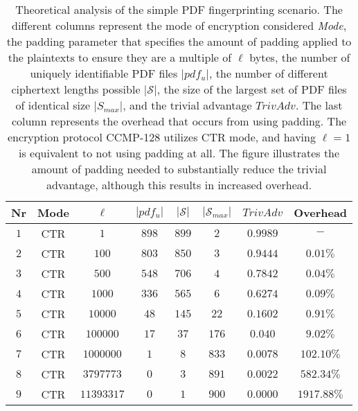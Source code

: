 \begin{table}
	\caption{Theoretical analysis of the simple PDF fingerprinting scenario. The different columns represent the mode of encryption considered \textit{Mode}, the padding parameter that specifies the amount of padding applied to the plaintexts to ensure they are a multiple of $\ell$ bytes, the number of uniquely identifiable PDF files \textit{$|pdf_{u}|$}, the number of different ciphertext lengths possible \textit{$|\mathcal{S}|$}, the size of the largest set of PDF files of identical size \textit{$|S_{max}|$}, and the trivial advantage \textit{$TrivAdv$}. The last column represents the overhead that occurs from using padding. The encryption protocol CCMP-128 utilizes CTR mode, and having $\ell = 1$ is equivalent to not using padding at all. The figure illustrates the amount of padding needed to substantially reduce the trivial advantage, although this results in increased overhead.}
    \centering
    \begin{tabular}{|c| c c c c c |c|c|}
    		\hline
        Nr & Mode & $\ell$ & $|pdf_{u}|$ & $|\mathcal{S}|$ & $|\mathcal{S}_{max}|$ & $TrivAdv$ & Overhead\\
        \hline
        \hline
        $1$ & CTR & $1$ & $898$ & $899$ & $2$ & $0.9989$ & $-$ \\
        \hline
        $2$ & CTR & $100$ & $803$ & $850$ & $3$ & $0.9444$ & $0.01\%$ \\
        \hline
        $3$ & CTR & $500$ & $548$ & $706$ & $4$ & $0.7842$ & $0.04\%$\\
        \hline
        $4$ & CTR & $1000$ & $336$ & $565$ & $6$ & $0.6274$ & $0.09\%$\\
        \hline
        $5$ & CTR & $10 000$ & $48$ & $145$ & $22$ & $0.1602$ & $0.91\%$\\
        \hline
        $6$ & CTR & $100 000$ & $17$ & $37$ & $176$ & $0.040$ & $9.02\%$\\
        \hline
        $7$ & CTR & $1 000 000$ & $1$ & $8$ & $833$ & $0.0078$ & $102.10\%$\\
        \hline
        $8$ & CTR & $3 797 773$ & $0$ & $3$ & $891$ & $0.0022$ & $582.34\%$\\
        \hline
        $9$ & CTR & $11 393 317$ & $0$ & $1$ & $900$ & $0.0000$ & $1917.88\%$\\
        \hline
    \end{tabular}
    \label{trivsuccfigure1}
\end{table}

\clearpage 

